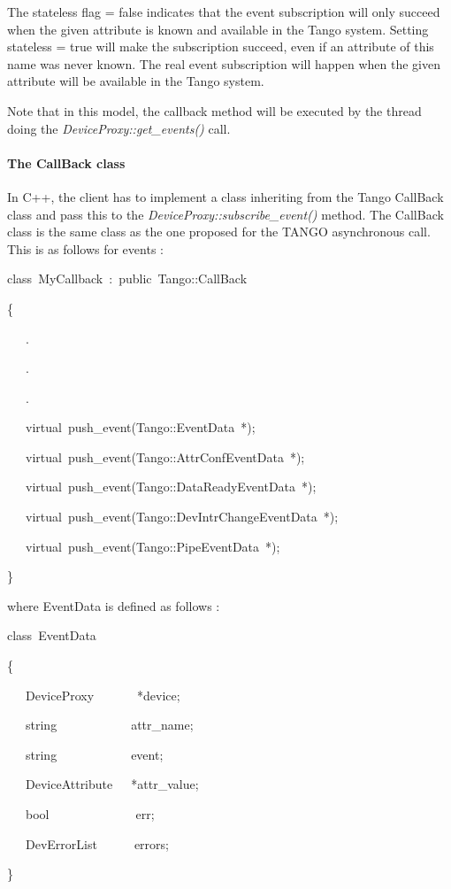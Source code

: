 The stateless flag = false indicates that the event subscription will
only succeed when the given attribute is known and available in the
Tango system. Setting stateless = true will make the subscription
succeed, even if an attribute of this name was never known. The real
event subscription will happen when the given attribute will be available
in the Tango system.

Note that in this model, the callback method will be executed by the
thread doing the \emph{DeviceProxy::get\_events()} call.

\paragraph{The CallBack class}

In C++, the client has to implement a class inheriting from the Tango
CallBack class and pass this to the \emph{DeviceProxy::subscribe\_event()}
method. The CallBack class is the same class as the one proposed for
the TANGO asynchronous call. This is as follows for events :
\begin{lyxcode}
class~MyCallback~:~public~Tango::CallBack

\{

~~~.

~~~.

~~~.

~~~virtual~push\_event(Tango::EventData~{*});

~~~virtual~push\_event(Tango::AttrConfEventData~{*});

~~~virtual~push\_event(Tango::DataReadyEventData~{*});

~~~virtual~push\_event(Tango::DevIntrChangeEventData~{*});

~~~virtual~push\_event(Tango::PipeEventData~{*});

\}
\end{lyxcode}
where EventData is defined as follows :
\begin{lyxcode}
class~EventData~

\{

~~~DeviceProxy~~~~~~~{*}device;

~~~string~~~~~~~~~~~~attr\_name;

~~~string~~~~~~~~~~~~event;

~~~DeviceAttribute~~~{*}attr\_value;

~~~bool~~~~~~~~~~~~~~err;

~~~DevErrorList~~~~~~errors;

\}
\end{lyxcode}
